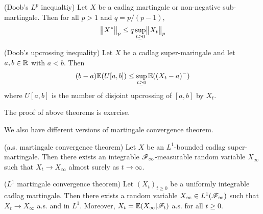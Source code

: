 \documentclass[12pt,a4paper]{report}
\newenvironment{proof}
{\begin{changemargin}{1cm}{0.5cm} 
	}%
	{\end{changemargin}
}
\begin{document}
(Doob's $L^p$ inequaltiy) Let $X$ be a cadlag martingale or non-negative sub-martingale. Then for all $p>1$ and $q = p/(p-1)$,
\begin{align*}
\bigl\lVert X^*\bigr\rVert_{p}  \leq q\sup_{t\geq 0} \bigl\lVert X_t\bigr\rVert_{p}
\end{align*}
\s

(Doob's upcrossing inequality) Let $X$ be a cadlag super-maringale and let $a,b\in \mathbb{R}$ with $a<b$. Then 
\begin{align*}
(b-a) \mathbb{E}(U[a,b]) \leq \sup_{t\geq 0} \mathbb{E}((X_t-a)^-)
\end{align*}
where $U[a,b]$ is the number of disjoint upcrossing of $[a,b]$ by $X_t$.
\begin{proof}
\pf The proof of above theorems is exercise.
\end{proof}
\s

We also have different versions of martingale convergence theorem.
\s

 (a.s. martingale convergence theorem) Let $X$ be an $L^1$-bounded cadlag super-martingale. Then there exists an integrable $\mathscr{F}_{\infty}$-measurable random variable $X_{\infty}$ such that $X_t \rightarrow X_{\infty}$ almost surely as $t\rightarrow \infty$. 
\s

 ($L^1$ martingale convergence theorem) Let $(X_t)_{t\geq 0}$ be a uniformly integrable cadlag martingale. Then there exists a random variable $X_{\infty} \in L^1(\mathscr{F}_{\infty})$ such that $X_t \rightarrow X_{\infty}$ a.s. and in $L^1$. Moreover, $X_t = \mathbb{E}(X_{\infty}|\mathscr{F}_t)$ a.s. for all $t\geq 0$.
\end{document}
